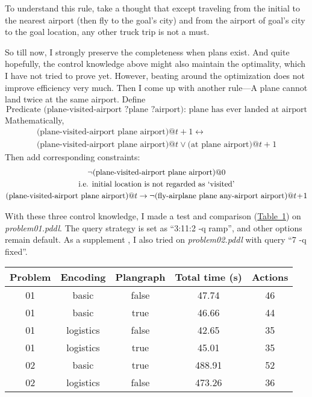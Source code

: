 \documentclass{article}
\begin{document}
To understand this rule, take a thought that except traveling from the initial to the nearest airport (then fly to the goal's city) and from the airport of goal's city to the goal location, any other truck trip is not a must.

So till now, I strongly preserve the completeness when plans exist. And quite hopefully, the control knowledge above might also maintain the optimality, which I have not tried to prove yet. However, beating around the optimization does not improve efficiency very much. Then I come up with another rule---A plane cannot land twice at the same airport. Define
\begin{equation}
\text{Predicate (plane-visited-airport ?plane ?airport): plane has ever landed at airport}
\end{equation}
Mathematically,
\begin{multline}
\text{(plane-visited-airport plane airport)}@t\!+\!1 \leftrightarrow \\
\text{(plane-visited-airport plane airport)}@t \lor \text{(at plane airport)}@t\!+\!1
\end{multline}
Then add corresponding constraints:
\begin{gather}
\lnot\text{(plane-visited-airport plane airport)}@0 \\
\text{i.e. initial location is not regarded as `visited'} \notag\\
\text{(plane-visited-airport plane airport)}@t \to \lnot\text{(fly-airplane plane any-airport airport)}@t\!+\!1
\end{gather}

With these three control knowledge, I made a test and comparison (\hyperref[tab-1]{Table~1}) on \emph{problem01.pddl}. The query strategy is set as ``3:11:2 -q ramp'', and other options remain default. As a supplement , I also tried on \emph{problem02.pddl} with query ``7 -q fixed''.

\begin{center}
	\label{tab-1}
	\begin{tabular}{ccccc}
		\toprule
		Problem & Encoding & Plangraph & Total time (s) & Actions\\
		\midrule
		01 & basic & false & 47.74 & 46 \\
		01 & basic & true & 46.66 & 44 \\
		01 & logistics & false & 42.65 & 35 \\
		01 & logistics & true & 45.01 & 35 \\
		02 & basic & true & 488.91 & 52 \\
		02 & logistics & false & 473.26 & 36 \\
		\bottomrule
	\end{tabular}
\end{center}
\end{document}
